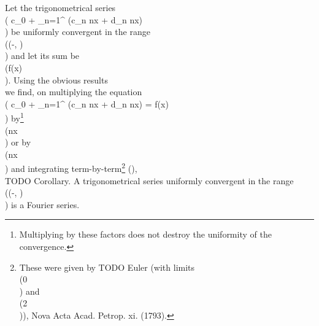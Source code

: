 Let the trigonometrical series
\\(
 c_{0}
+
\sum_{n=1}^{\infty} (c_{n} \cos nx + d_{n} \sin nx)
\\)
be uniformly convergent in the range \\((-\pi, \pi)\\) and let its sum be \\(f(x)\\).
Using the obvious results
\\[ \begin{align*}
  \int_{-\pi}^{\pi}\! \cos mx \cos nx \, d x
  =&
  \begin{cases}
    0 & m \neq n \\
    \pi & m = n \neq 0,
  \end{cases}
  \\
  \int_{-\pi}^{\pi}\! \sin mx \sin nx \, d x
  =&
  \begin{cases}
    0 & m \neq n \\
    \pi & m = n \neq 0,
  \end{cases}
  \\
  \int_{-\pi}^{\pi}\! \, d x
  =& 2\pi,
\end{align*} \\]
we find, on multiplying the equation
\\(
 c_{0}
+
\sum_{n=1}^{\infty}
(c_{n} \cos nx + d_{n} \sin nx)
= f(x)
\\)
by\footnote{Multiplying by these factors does not destroy the uniformity of the
  convergence.}
\\(\cos nx\\) or by \\(\sin nx\\) and integrating
term-by-term\footnote{These were given by TODO Euler (with limits \\(0\\) and \\(2\pi\\)),
  Nova Acta Acad. Petrop. xi. (1793).}
(),
\\[ 
\pi c_{n} = \int_{-\pi}^{\pi}\! f(x) \cos nx \, d x,
\quad
\pi d_{n} = \int_{-\pi}^{\pi}\! f(x) \sin nx \, d x.
\\] 

TODO Corollary. A trigonometrical series uniformly convergent in the range
\\((-\pi, \pi)\\) is a Fourier series.

